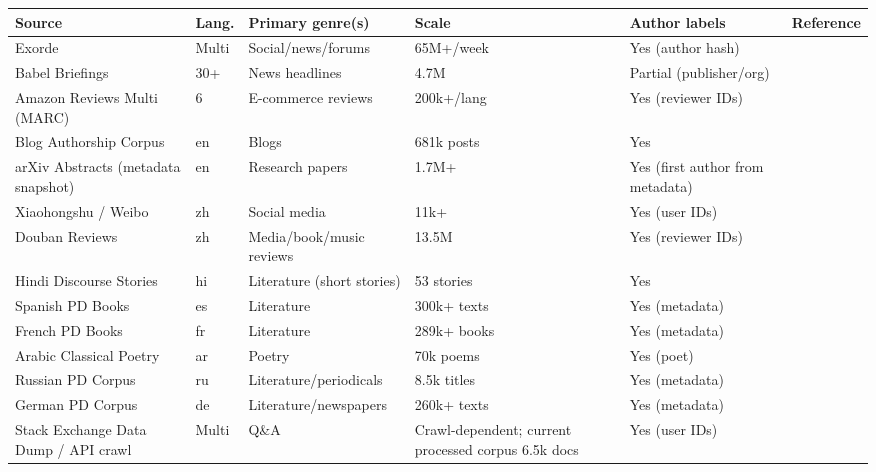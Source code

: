 \documentclass{article}
\newcommand{\rev}[1]{#1}
\begin{document}
\begin{table}[h!]
\centering
\small
\setlength{\tabcolsep}{4pt}
\renewcommand{\arraystretch}{1.15}
\begin{tabularx}{\textwidth}{@{}l l l l l X@{}}
\toprule
\textbf{Source} & \textbf{Lang.} & \textbf{Primary genre(s)} & \textbf{Scale} & \textbf{Author labels} & \textbf{Reference} \\
\midrule
Exorde & Multi & Social/news/forums & 65M+/week & Yes (author hash) &
\citep{exorde_social_media_dec2024_week1} \\
Babel Briefings & 30+ & News headlines & 4.7M & Partial (publisher/org) &
\citep{leeb2024babelbriefings,babel_briefings_dataset} \\
Amazon Reviews Multi (MARC) & 6 & E-commerce reviews & 200k+/lang & Yes (reviewer IDs) &
\citep{keung2020marc,amazon_reviews_multi_kaggle} \\
Blog Authorship Corpus & en & Blogs & 681k posts & Yes &
\citep{schler2006blogauthorship,blog_authorship_corpus_hf} \\
\rev{arXiv Abstracts (metadata snapshot)} & en & Research papers & 1.7M+ & \rev{Yes (first author from metadata)} &
\citep{arxiv_bulk_data_access,cornell_arxiv_kaggle} \\
Xiaohongshu / Weibo & zh & Social media & 11k+ & Yes (user IDs) &
\citep{xiaohongshu_aigc_comments_kaggle} \\
Douban Reviews & zh & Media/book/music reviews & 13.5M & Yes (reviewer IDs) &
\citep{douban_reviews_kaggle} \\
Hindi Discourse Stories & hi & Literature (short stories) & 53 stories & Yes &
\citep{dhanwal2020hindi_discourse_modes,hindi_discourse_github} \\
Spanish PD Books & es & Literature & 300k+ texts & Yes (metadata) &
\citep{pleias_spanish_pd_books} \\
French PD Books & fr & Literature & 289k+ books & Yes (metadata) &
\citep{pleias_french_pd_books} \\
Arabic Classical Poetry & ar & Poetry & 70k poems & Yes (poet) &
\citep{arabic_poetry_kaggle} \\
Russian PD Corpus & ru & Literature/periodicals & 8.5k titles & Yes (metadata) &
\citep{pleias_russian_pd} \\
German PD Corpus & de & Literature/newspapers & 260k+ texts & Yes (metadata) &
\citep{pleias_german_pd} \\
{\color{red}Stack Exchange Data Dump / API crawl} & {\color{red}Multi} & {\color{red}Q\&A} & {\color{red}Crawl-dependent; current processed corpus 6.5k docs} & {\color{red}Yes (user IDs)} &

\end{tabularx}
\end{table}
\end{document}
